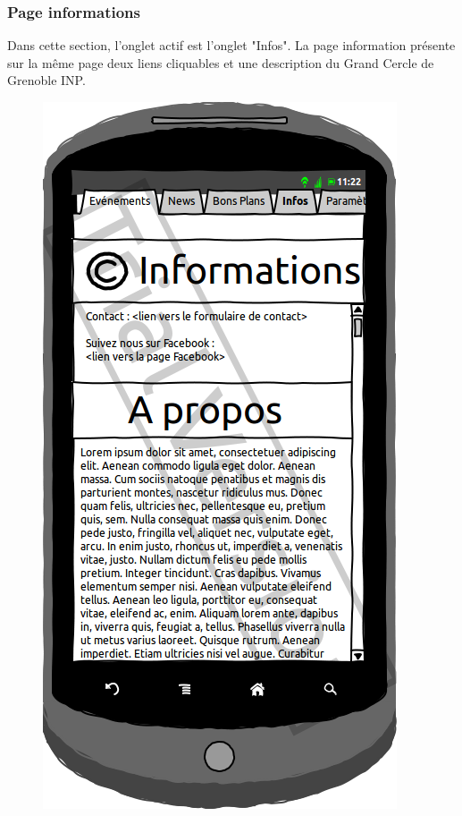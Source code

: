 \documentclass[a4paper, 11px]{article}
\begin{document}
\subsubsection{Page informations}
Dans cette section, l'onglet actif est l'onglet "Infos".
La page information présente sur la même page deux liens cliquables et une description du Grand Cercle de Grenoble INP.
\vfill
\begin{figure}[htbp]
	\begin{minipage}[c]{.50\linewidth}
		\begin{center}
			\includegraphics[scale=0.3]{../../Sketch/Android/Infos.png}
		\end{center}
	\end{minipage}
\end{figure}
\end{document}
